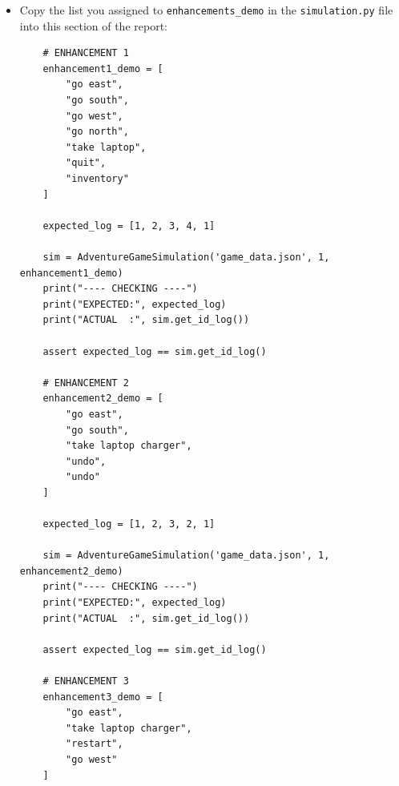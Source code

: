 \documentclass[11pt]{article}
\begin{document}
\begin{enumerate}
\begin{itemize}
\medskip
        \texttt{Class ArenaPlayer} :
        \begin{itemize}
            \item \texttt{def arena\_energy\_cost}
            \item \texttt{def arena\_beats}
            \item \texttt{def arena\_resolve\_round}
            \item \texttt{def arena\_parse\_move}
            \item \texttt{def arena\_enforce\_energy}
            \item \texttt{def arena\_ai\_choose}
            \item \texttt{def arena\_print\_rules}
            \item \texttt{def arena\_prompt\_move}
            \item \texttt{def arena\_apply\_regen}
            \item \texttt{def play\_evolution\_arena}
        \end{itemize}
        \item Copy the list you assigned to \texttt{enhancements\_demo} in the \texttt{simulation.py} file into this section of the report:

        \begin{verbatim}
    # ENHANCEMENT 1
    enhancement1_demo = [
        "go east",
        "go south",
        "go west",
        "go north",
        "take laptop",
        "quit",
        "inventory"
    ]

    expected_log = [1, 2, 3, 4, 1]

    sim = AdventureGameSimulation('game_data.json', 1, enhancement1_demo)
    print("---- CHECKING ----")
    print("EXPECTED:", expected_log)
    print("ACTUAL  :", sim.get_id_log())

    assert expected_log == sim.get_id_log()

    # ENHANCEMENT 2
    enhancement2_demo = [
        "go east",
        "go south",
        "take laptop charger",
        "undo",
        "undo"
    ]

    expected_log = [1, 2, 3, 2, 1]

    sim = AdventureGameSimulation('game_data.json', 1, enhancement2_demo)
    print("---- CHECKING ----")
    print("EXPECTED:", expected_log)
    print("ACTUAL  :", sim.get_id_log())

    assert expected_log == sim.get_id_log()

    # ENHANCEMENT 3
    enhancement3_demo = [
        "go east",
        "take laptop charger",
        "restart",
        "go west"
    ]


\end{verbatim}
\end{itemize}
\end{enumerate}
\end{document}
